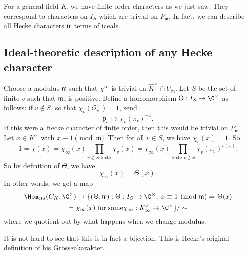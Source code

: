 \documentclass[a4paper]{article}
\begin{document}
For a general field $K$, we have finite order characters as we just saw. They correspond to characters on $I_S$ which are trivial on $P_\mathfrak{m}$. In fact, we can describe all Hecke characters in terms of ideals.

\subsection{Ideal-theoretic description of any Hecke character}
Choose a modulus $\mathfrak{m}$ such that $\chi^\infty$ is trivial on $\hat{K}^\times \cap U_\mathfrak{m}$. Let $S$ be the set of finite $v$ such that $\mathfrak{m}_v$ is positive. Define a homomorphism $\Theta: I_S \to \C^\times$ as follows: if $v \not \in S$, so that $\chi_v(\mathcal{O}_v^\times) = 1$, send
\[
  \mathfrak{p}_v \mapsto \chi_v(\pi_v)^{-1}.
\]
If this were a Hecke character of finite order, then this would be trivial on $P_\mathfrak{m}$. Let $x \in K^\times$ with $x \equiv 1 \pmod \mathfrak{m}$. Then for all $v \in S$, we have $\chi_v(x) = 1$. So
\[
  1 = \chi(x) = \chi_\infty(x) \prod_{v \not \in S\text{ finite}} \chi_v(x) = \chi_\infty(x) \prod_{\text{finite }v \not \in S} \chi_v(\pi_v)^{v(x)}.
\]
So by definition of $\Theta$, we have
\[
  \chi_\infty(x) = \Theta(x).
\]
In other words, we get a map
\begin{multline*}
  \Hom_{cts}(C_K, \C^\times) \to \{(\Theta, \mathfrak{m}) : \Theta: I_S \to \C^\times, \;x \equiv 1 \pmod {\mathfrak{m}} \Rightarrow \Theta(x) \\
  = \chi_\infty(x)\text{ for some}\chi_\infty: K_\infty^\times \to \C^\times\}/\sim
\end{multline*}
where we quotient out by what happens when we change modulus.

It is not hard to see that this is in fact a bijection. This is Hecke's original definition of his Gr\"ossenkarakter.
\end{document}
